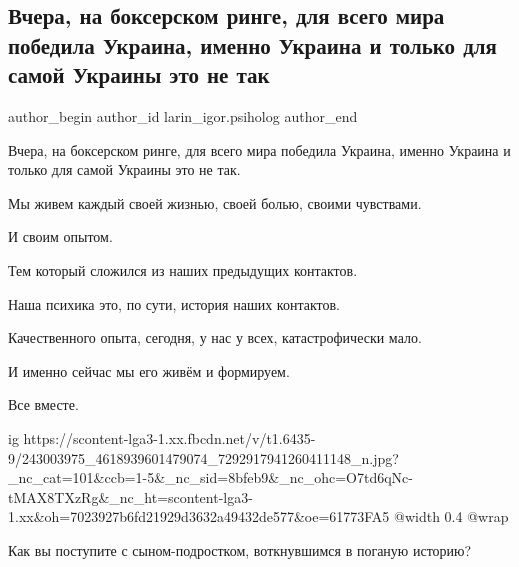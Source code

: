  
 
 
 
 
 
\subsection{Вчера, на боксерском ринге, для всего мира победила Украина, именно Украина и только для самой Украины это не так}
\label{sec:26_09_2021.fb.larin_igor.psiholog.1.ukraina_usik_pobeda}
 
\ifcmt
 author_begin
   author_id larin_igor.psiholog
 author_end
\fi

Вчера, на боксерском ринге, для всего мира победила Украина, именно Украина и
только для самой Украины это не так.

Мы живем каждый своей жизнью, своей болью, своими чувствами.

И своим опытом. 

Тем который сложился из наших предыдущих контактов. 

Наша психика это, по сути, история наших контактов.

Качественного опыта, сегодня,  у нас у всех, катастрофически мало.

И именно сейчас мы его живём и формируем.

Все вместе.

\ifcmt
  ig https://scontent-lga3-1.xx.fbcdn.net/v/t1.6435-9/243003975_4618939601479074_7292917941260411148_n.jpg?_nc_cat=101&ccb=1-5&_nc_sid=8bfeb9&_nc_ohc=O7td6qNc-tMAX8TXzRg&_nc_ht=scontent-lga3-1.xx&oh=7023927b6fd21929d3632a49432de577&oe=61773FA5
  @width 0.4
  @wrap 
\fi

Как вы поступите с сыном-подростком, воткнувшимся в поганую историю? 

